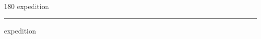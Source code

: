 
\begin{frame}
\begin{center}
\begin{turn}{180}
{\fontsize{2.5cm}{1em}\selectfont expedition}
\end{turn}
\vspace{1em}\par  
\hrule
\vspace{1em}\par  
{\fontsize{2.5cm}{1em}\selectfont expedition}
\end{center}
\end{frame}
